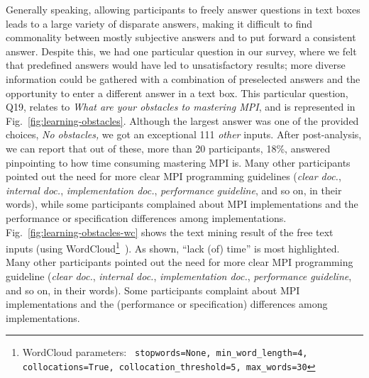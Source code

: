 \documentclass[preprint,5p,times]{elsarticle}
\def\myquote#1{{\it #1}}
\newcommand{\revision}[2]{{\color{blue}#2}}
\begin{document}
Generally speaking, allowing participants to freely answer questions in text
boxes leads to a large variety of disparate answers, making it difficult to find
commonality between mostly subjective answers and to put forward a consistent
answer. Despite this, we had one particular question in our survey, where we
felt that predefined answers would have led to unsatisfactory results;
more diverse information could be gathered with a combination of
preselected answers and the opportunity to enter a different answer in a text
box. This particular question, Q19, relates to \myquote{What are your obstacles
to mastering MPI}, and is represented in Fig.~\ref{fig:learning-obstacles}.
Although the largest answer was one of the provided choices, \myquote{No
obstacles,} we got an exceptional 111 \myquote{other} inputs.
After post-analysis, we can report that out of these,
more than 20 participants, 18\%, answered pinpointing
to how time consuming mastering MPI is. Many other
participants pointed out the need for more clear MPI programming guidelines
(\myquote{clear doc.}, \myquote{internal doc.}, \myquote{implementation doc.},
\myquote{performance guideline}, and so on, in their words), while
some participants complained
about MPI implementations and the performance or specification
differences among implementations.
\revision{}{Fig.~\ref{fig:learning-obstacles-wc} shows the text mining result of
the free text inputs
(using WordCloud\footnote{WordCloud parameters: \tt
  stopwords=None, min\_word\_length=4, collocations=True,
  collocation\_threshold=5, max\_words=30}~\cite{wordcloud}).
As shown, ``lack (of) time'' is most highlighted.}
Many other
participants pointed out the need for more clear MPI programming guideline
(\myquote{clear doc.}, \myquote{internal doc.}, \myquote{implementation doc.},
\myquote{performance guideline}, and so on, in their words). Some participants
\revision{complaints}{complaint} about MPI implementations and the (performance or specification)
differences among implementations.
\end{document}
